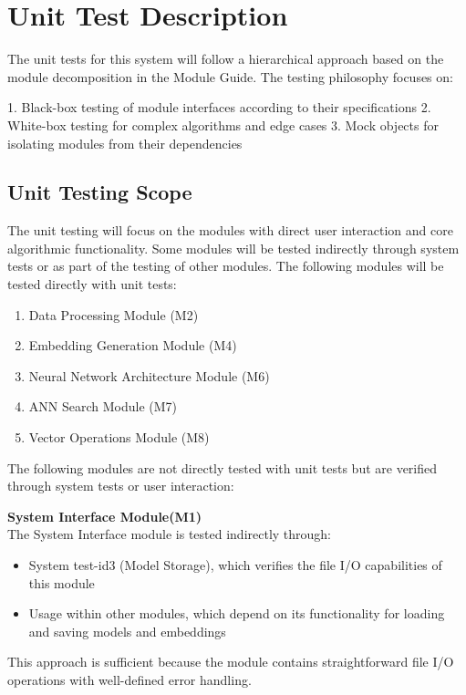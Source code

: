 \documentclass[12pt, titlepage]{article}
\begin{document}
\section{Unit Test Description}\label{UnitTest}

The unit tests for this system will follow a hierarchical approach based on the module decomposition in the Module Guide. The testing philosophy focuses on:

1. Black-box testing of module interfaces according to their specifications
2. White-box testing for complex algorithms and edge cases
3. Mock objects for isolating modules from their dependencies

\subsection{Unit Testing Scope}

The unit testing will focus on the modules with direct user interaction and core algorithmic functionality. Some modules will be tested indirectly through system tests or as part of the testing of other modules. The following modules will be tested directly with unit tests:
\begin{enumerate}
  \item Data Processing Module (M2)
  \item Embedding Generation Module (M4)
  \item Neural Network Architecture Module (M6)
  \item ANN Search Module (M7)
  \item Vector Operations Module (M8)
\end{enumerate}


The following modules are not directly tested with unit tests but are verified through system tests or user interaction:

\noindent\textbf{System Interface Module(M1)}\\
The System Interface module is tested indirectly through:
\begin{itemize}
    \item System test-id3 (Model Storage), which verifies the file I/O capabilities of this module
    \item Usage within other modules, which depend on its functionality for loading and saving models and embeddings
\end{itemize}

This approach is sufficient because the module contains straightforward file I/O operations with well-defined error handling.
\end{document}
